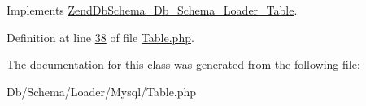 Implements \hyperlink{interfaceZendDbSchema__Db__Schema__Loader__Table_a7e8a4db5f824367515ae7106e472ddfb}{Zend\-Db\-Schema\-\_\-\-Db\-\_\-\-Schema\-\_\-\-Loader\-\_\-\-Table}.



Definition at line \hyperlink{Loader_2Mysql_2Table_8php_source_l00038}{38} of file \hyperlink{Loader_2Mysql_2Table_8php_source}{Table.\-php}.



The documentation for this class was generated from the following file\-:\begin{DoxyCompactItemize}
\item 
Db/\-Schema/\-Loader/\-Mysql/Table.\-php\end{DoxyCompactItemize}
